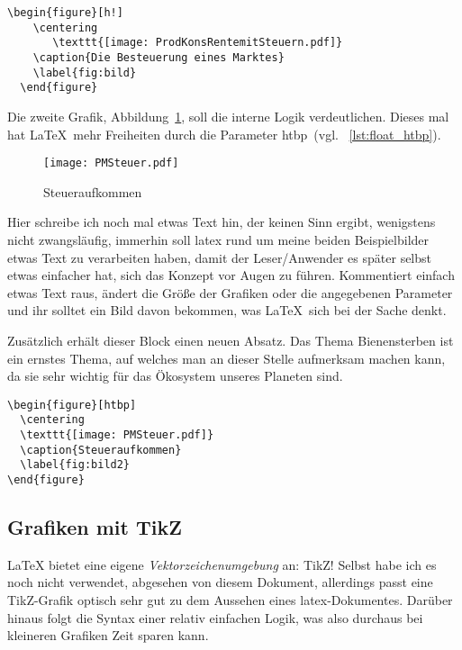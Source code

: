\begin{lstlisting}[float=htb,caption=Einbindung einer Grafik so nah wie möglich am Text,label=lst:float_h]
  \begin{figure}[h!]
    \centering
       \texttt{[image: ProdKonsRentemitSteuern.pdf]}
    \caption{Die Besteuerung eines Marktes}
    \label{fig:bild}
  \end{figure}
\end{lstlisting}

Die zweite Grafik, Abbildung~\ref{fig:bild2}, soll die interne Logik verdeutlichen. Dieses mal hat \LaTeX{}\ mehr Freiheiten durch die Parameter \glqq htbp\grqq\ (vgl. ~\ref{lst:float_htbp}).

\begin{figure}[htbp]
  \centering
     \texttt{[image: PMSteuer.pdf]}
  \caption{Steueraufkommen}
  \label{fig:bild2}
\end{figure}

Hier schreibe ich noch mal etwas Text hin, der keinen Sinn ergibt, wenigstens nicht zwangsläufig, immerhin soll \gls{latex} rund um meine beiden Beispielbilder etwas Text zu verarbeiten haben, damit der Leser/Anwender es später selbst etwas einfacher hat, sich das Konzept vor Augen zu führen. Kommentiert einfach etwas Text raus, ändert die Größe der Grafiken oder die angegebenen Parameter und ihr solltet ein Bild davon bekommen, was \LaTeX{}\ sich bei der Sache denkt.

Zusätzlich erhält dieser Block einen neuen Absatz. Das Thema Bienensterben ist ein ernstes Thema, auf welches man an dieser Stelle aufmerksam machen kann, da sie sehr wichtig für das Ökosystem unseres Planeten sind.

\begin{lstlisting}[float=htb,caption=Automatische Einbindung einer Grafik,label=lst:float_htbp]
\begin{figure}[htbp]
  \centering
  \texttt{[image: PMSteuer.pdf]}
  \caption{Steueraufkommen}
  \label{fig:bild2}
\end{figure}
\end{lstlisting}
\subsection{Grafiken mit TikZ}%
\label{sec:tikzgraph}
\LaTeX{} bietet eine eigene \emph{Vektorzeichenumgebung} an: \glqq TikZ\grqq! Selbst habe ich es noch nicht verwendet, abgesehen von diesem Dokument, allerdings passt eine \glqq TikZ-Grafik \grqq optisch sehr gut zu dem Aussehen eines \gls{latex}-Dokumentes. Darüber hinaus folgt die Syntax einer relativ einfachen Logik, was also durchaus bei kleineren Grafiken Zeit sparen kann.


